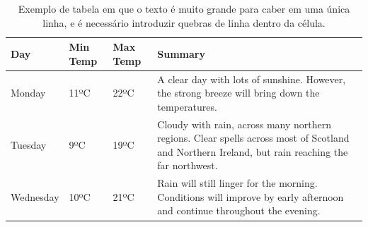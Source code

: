 \documentclass[times,english,brazil,oneside,section=TITLE]{ifes8}
\begin{document}
\begin{table}[h]
  \begin{center}
    \caption[Exemplo de tabela em que é necessário quebras de linha.]{Exemplo de
      tabela em que o texto é muito grande para caber em uma única linha, e é
      necessário introduzir quebras de linha dentro da célula.}
    \label{tab:ex3}
    \begin{tabular}{lllp{5cm}}
      \toprule
      Day       & Min Temp & Max Temp & Summary                                                      \\
      \midrule
      Monday    & 11ºC     & 22ºC     & A clear day with lots of sunshine.  
                                        However, the strong breeze will bring down the temperatures. \\
      Tuesday   & 9ºC      & 19ºC     & Cloudy with rain, across many northern regions. Clear spells 
                                        across most of Scotland and Northern Ireland, 
                                        but rain reaching the far northwest.                         \\
      Wednesday & 10ºC     & 21ºC     & Rain will still linger for the morning. 
                                        Conditions will improve by early afternoon and continue 
                                        throughout the evening.                                      \\
      \bottomrule
    \end{tabular}
  \end{center}
\end{table}
\end{document}

